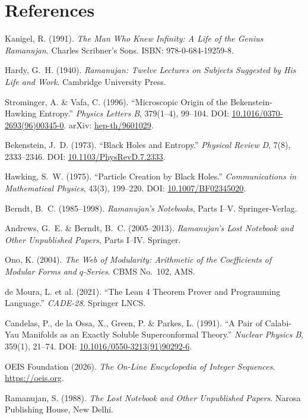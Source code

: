 \documentclass[11pt,a4paper]{article}
\begin{document}
\section*{References}
\small
\begin{enumerate}[leftmargin=2em, label={[\arabic*]}]
    \item Kanigel, R. (1991). \textit{The Man Who Knew Infinity: A Life of the Genius Ramanujan}. Charles Scribner's Sons. ISBN: 978-0-684-19259-8.
    \item Hardy, G.~H. (1940). \textit{Ramanujan: Twelve Lectures on Subjects Suggested by His Life and Work}. Cambridge University Press.
    \item Strominger, A. \& Vafa, C. (1996). ``Microscopic Origin of the Bekenstein-Hawking Entropy.'' \textit{Physics Letters B}, 379(1--4), 99--104. DOI: \href{https://doi.org/10.1016/0370-2693(96)00345-0}{10.1016/0370-2693(96)00345-0}. arXiv: \href{https://arxiv.org/abs/hep-th/9601029}{hep-th/9601029}.
    \item Bekenstein, J.~D. (1973). ``Black Holes and Entropy.'' \textit{Physical Review D}, 7(8), 2333--2346. DOI: \href{https://doi.org/10.1103/PhysRevD.7.2333}{10.1103/PhysRevD.7.2333}.
    \item Hawking, S.~W. (1975). ``Particle Creation by Black Holes.'' \textit{Communications in Mathematical Physics}, 43(3), 199--220. DOI: \href{https://doi.org/10.1007/BF02345020}{10.1007/BF02345020}.
    \item Berndt, B.~C. (1985--1998). \textit{Ramanujan's Notebooks}, Parts I--V. Springer-Verlag.
    \item Andrews, G.~E. \& Berndt, B.~C. (2005--2013). \textit{Ramanujan's Lost Notebook and Other Unpublished Papers}, Parts I--IV. Springer.
    \item Ono, K. (2004). \textit{The Web of Modularity: Arithmetic of the Coefficients of Modular Forms and $q$-Series}. CBMS No.~102, AMS.
    \item de Moura, L. et al. (2021). ``The Lean 4 Theorem Prover and Programming Language.'' \textit{CADE-28}. Springer LNCS.
    \item Candelas, P., de la Ossa, X., Green, P. \& Parkes, L. (1991). ``A Pair of Calabi-Yau Manifolds as an Exactly Soluble Superconformal Theory.'' \textit{Nuclear Physics B}, 359(1), 21--74. DOI: \href{https://doi.org/10.1016/0550-3213(91)90292-6}{10.1016/0550-3213(91)90292-6}.
    \item OEIS Foundation (2026). \textit{The On-Line Encyclopedia of Integer Sequences}. \url{https://oeis.org}.
    \item Ramanujan, S. (1988). \textit{The Lost Notebook and Other Unpublished Papers}. Narosa Publishing House, New Delhi.
\end{enumerate}
\end{document}
